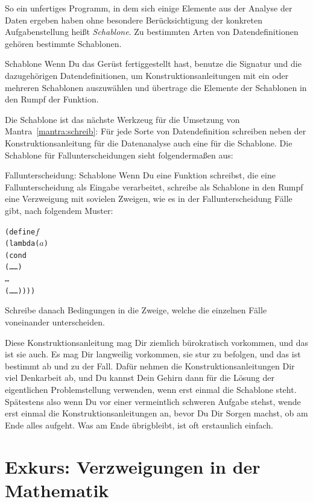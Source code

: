 So ein unfertiges Programm, in dem sich einige Elemente aus der
Analyse der Daten ergeben haben ohne besondere Berücksichtigung der
konkreten Aufgabenstellung heißt \textit{Schablone}.  Zu bestimmten
Arten von Datendefinitionen gehören bestimmte Schablonen.

\begin{konstruktionsanleitung}{Schablone}
  Wenn Du das Gerüst fertiggestellt hast, benutze die Signatur und die
  dazugehörigen Datendefinitionen, um Konstruktionsanleitungen mit ein
  oder mehreren Schablonen auszuwählen und übertrage die Elemente der
  Schablonen in den Rumpf der Funktion.
\end{konstruktionsanleitung}
%
Die Schablone ist das nächste Werkzeug für die Umsetzung von
Mantra~\ref{mantra:schreib}:
%
\mantraschreib*
%
\noindent Für jede Sorte von Datendefinition schreiben neben der
Konstruktionsanleitung für die Datenanalyse auch eine für die
Schablone.  Die Schablone für Fallunterscheidungen sieht
folgendermaßen aus:
%
\begin{konstruktionsanleitung}{Fallunterscheidung: Schablone}
  \label{ka:fallunterscheidung-schablone}
  Wenn Du eine Funktion schreibst, die eine Fallunterscheidung als
  Eingabe verarbeitet, schreibe als Schablone in den Rumpf eine
  Verzweigung mit sovielen Zweigen, wie es in der Fallunterscheidung
  Fälle gibt, nach folgendem Muster:
\begin{alltt}
(define \(f\)
  (lambda (\(a\))
    (cond
      (\ldots{} \ldots)
      \ldots
      (\ldots{} \ldots))))
\end{alltt}
  Schreibe danach Bedingungen in die Zweige, welche die einzelnen
  Fälle voneinander unterscheiden.
\end{konstruktionsanleitung}
%
Diese Konstruktionsanleitung mag Dir ziemlich bürokratisch vorkommen,
und das ist sie auch.  Es mag Dir langweilig vorkommen, sie stur zu
befolgen, und das ist bestimmt ab und zu der Fall.  Dafür nehmen die
Konstruktionsanleitungen Dir viel Denkarbeit ab, und Du kannst Dein
Gehirn dann für die Lösung der eigentlichen Problemstellung verwenden,
wenn erst einmal die Schablone steht.  Spätestens also wenn Du vor
einer vermeintlich schweren Aufgabe stehst, wende erst einmal die
Konstruktionsanleitungen an, bevor Du Dir Sorgen machst, ob am Ende
alles aufgeht.  Was am Ende übrigbleibt, ist oft erstaunlich einfach.

\section{Exkurs: Verzweigungen in der Mathematik}

